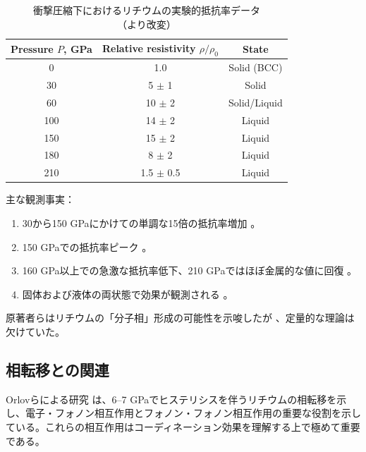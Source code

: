 \documentclass[11pt,a4paper]{article}
\theoremstyle{remark}
\begin{document}
	\begin{table}[H]
		\begin{otherlanguage}{english}
			\centering
			\caption{Experimental lithium resistivity data under shock compression (adapted from \cite{fortov2001, yakushev2002})}
			\label{tab:exp_data}
			\begin{tabular}{ccc}
				\toprule
				Pressure \(P\), GPa & Relative resistivity \(\rho/\rho_0\) & State \\
				\midrule
				0 & 1.0 & Solid (BCC) \\
				30 & 5 \(\pm\) 1 & Solid \\
				60 & 10 \(\pm\) 2 & Solid/Liquid \\
				100 & 14 \(\pm\) 2 & Liquid \\
				150 & 15 \(\pm\) 2 & Liquid \\
				180 & 8 \(\pm\) 2 & Liquid \\
				210 & 1.5 \(\pm\) 0.5 & Liquid \\
				\bottomrule
			\end{tabular}
		\end{otherlanguage}
		\caption{衝撃圧縮下におけるリチウムの実験的抵抗率データ（\cite{fortov2001, yakushev2002}より改変）}
	\end{table}
	
	主な観測事実：
	\begin{enumerate}
		\item 30から150 GPaにかけての単調な15倍の抵抗率増加 \cite{fortov2001}。
		\item 150 GPaでの抵抗率ピーク \cite{yakushev2002}。
		\item 160 GPa以上での急激な抵抗率低下、210 GPaではほぼ金属的な値に回復 \cite{yakushev2002}。
		\item 固体および液体の両状態で効果が観測される \cite{fortov2001}。
	\end{enumerate}
	
	原著者らはリチウムの「分子相」形成の可能性を示唆したが \cite{fortov1999}、定量的な理論は欠けていた。
	
	\subsection{相転移との関連}
	
	Orlovらによる研究 \cite{orlov2001} は、6–7 GPaでヒステリシスを伴うリチウムの相転移を示し、電子・フォノン相互作用とフォノン・フォノン相互作用の重要な役割を示している。これらの相互作用はコーディネーション効果を理解する上で極めて重要である。
	
\end{document}
